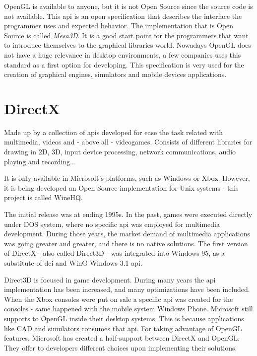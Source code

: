 OpenGL is available to anyone, but it is not Open Source since the source code is not available. This \gls{api} is
an open specification that describes the interface the programmer uses and expected behavior. The implementation
that is Open Source is called \emph{Mesa3D}. It is a good start point for the programmers that want to introduce
themselves to the graphical libraries world. Nowadays OpenGL does not have a huge relevance in desktop environments,
a few companies uses this standard as a first option for developing. This specification is very used for the creation
of graphical engines, simulators and mobile devices applications.

\section{DirectX}
Made up by a collection of \gls{api}s developed for ease the task related with multimedia, videos and - above all -
videogames. Consists of different libraries for drawing in 2D, 3D, input device processing, network communications,
audio playing and recording...

It is only available in Microsoft's platforms, such as Windows or Xbox. However, it is being developed an
Open Source implementation for Unix systems - this project is called WineHQ.

The initial release was at ending 1995s. In the past, games were executed directly under DOS system, where no
specific \gls{api} was employed for multimedia development. During those years, the market demand of multimedia
applications was going greater and greater, and there is no native solutions. The first version of DirectX - also
called Direct3D - was integrated into Windows 95, as a substitute of \gls{dci} and WinG Windows 3.1 \gls{api}.

Direct3D is focused in game development. During many years the \gls{api} implementation has been increased, and many
optimizations have been included. When the Xbox consoles were put on sale a specific \gls{api} was created for the
consoles - same happened with the mobile system Windows Phone. Microsoft still supports to OpenGL inside their desktop
systems. This is because applications like CAD and simulators consumes that \gls{api}. For taking advantage of
OpenGL features, Microsoft has created a half-support between DirectX and OpenGL. They offer to developers different
choices upon implementing their solutions.
